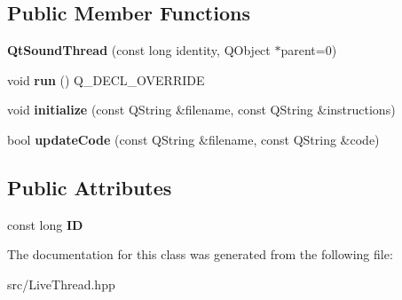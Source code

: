 \subsection*{Public Member Functions}
\begin{DoxyCompactItemize}
\item 
\hypertarget{classQtSoundThread_a2e0d96a054274862e8bb308042a2fc51}{{\bfseries Qt\+Sound\+Thread} (const long identity, Q\+Object $\ast$parent=0)}\label{classQtSoundThread_a2e0d96a054274862e8bb308042a2fc51}

\item 
\hypertarget{classQtSoundThread_a75d05a2b1b7229d30e259efc44ab591e}{void {\bfseries run} () Q\+\_\+\+D\+E\+C\+L\+\_\+\+O\+V\+E\+R\+R\+I\+D\+E}\label{classQtSoundThread_a75d05a2b1b7229d30e259efc44ab591e}

\item 
\hypertarget{classQtSoundThread_a1833428896d2db8c41410a7cb55b5246}{void {\bfseries initialize} (const Q\+String \&filename, const Q\+String \&instructions)}\label{classQtSoundThread_a1833428896d2db8c41410a7cb55b5246}

\item 
\hypertarget{classQtSoundThread_a3a682c0fe88abfa08d01e24951ce8089}{bool {\bfseries update\+Code} (const Q\+String \&filename, const Q\+String \&code)}\label{classQtSoundThread_a3a682c0fe88abfa08d01e24951ce8089}

\end{DoxyCompactItemize}
\subsection*{Public Attributes}
\begin{DoxyCompactItemize}
\item 
\hypertarget{classLiveThread_a5cfdefd7574fb1f34bbe1d21b5e3c1d8}{const long {\bfseries I\+D}}\label{classLiveThread_a5cfdefd7574fb1f34bbe1d21b5e3c1d8}

\end{DoxyCompactItemize}


The documentation for this class was generated from the following file\+:\begin{DoxyCompactItemize}
\item 
src/Live\+Thread.\+hpp\end{DoxyCompactItemize}
